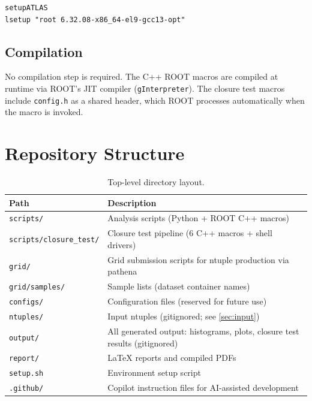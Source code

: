 \documentclass[12pt,a4paper]{article}
\begin{document}
\begin{lstlisting}
setupATLAS
lsetup "root 6.32.08-x86_64-el9-gcc13-opt"
\end{lstlisting}

\subsection{Compilation}

No compilation step is required. The C++ ROOT macros are compiled
at runtime via ROOT's JIT compiler (\texttt{gInterpreter}). The closure
test macros include \texttt{config.h} as a shared header, which ROOT
processes automatically when the macro is invoked.

\section{Repository Structure}
\label{sec:structure}

\begin{table}[htbp]
\centering
\caption{Top-level directory layout.}
\label{tab:dirs}
\small
\begin{tabular}{lp{10cm}}
\toprule
\textbf{Path} & \textbf{Description} \\
\midrule
\texttt{scripts/}         & Analysis scripts (Python + ROOT C++ macros) \\
\texttt{scripts/closure\_test/} & Closure test pipeline (6 C++ macros +
  shell drivers) \\
\texttt{grid/}             & Grid submission scripts for ntuple production
  via pathena \\
\texttt{grid/samples/}     & Sample lists (dataset container names) \\
\texttt{configs/}          & Configuration files (reserved for future use) \\
\texttt{ntuples/}          & Input ntuples (gitignored; see \cref{sec:input}) \\
\texttt{output/}           & All generated output: histograms, plots, closure
  test results (gitignored) \\
\texttt{report/}           & \LaTeX{} reports and compiled PDFs \\
\texttt{setup.sh}          & Environment setup script \\
\texttt{.github/}          & Copilot instruction files for AI-assisted
  development \\
\bottomrule
\end{tabular}
\end{table}
\end{document}
